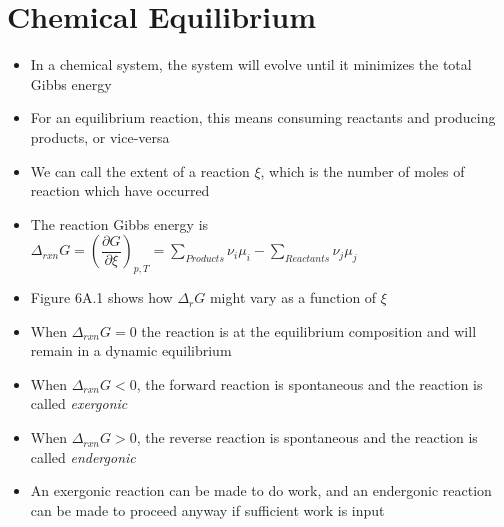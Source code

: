 \documentclass[12pt, openany, letterpaper]{memoir}
\begin{document}
\chapter{Chemical Equilibrium}
\begin{itemize}
	\item In a chemical system, the system will evolve until it minimizes the total Gibbs energy
	\item For an equilibrium reaction, this means consuming reactants and producing products, or vice-versa
	\item We can call the extent of a reaction $\xi$, which is the number of moles of reaction which have occurred
	\item The reaction Gibbs energy is $\Delta_{rxn}G=\left(\dfrac{\partial G}{\partial \xi}\right)_{p,T} = \displaystyle\sum\limits_{Products}\nu_i\mu_i - \displaystyle\sum\limits_{Reactants}\nu_j\mu_j$
	\item Figure 6A.1 shows how $\Delta_{r}G$ might vary as a function of $\xi$
	\item When $\Delta_{rxn}G=0$ the reaction is at the equilibrium composition and will remain in a dynamic equilibrium
	\item When $\Delta_{rxn}G<0$, the forward reaction is spontaneous and the reaction is called \emph{exergonic}
	\item When $\Delta_{rxn}G>0$, the reverse reaction is spontaneous and the reaction is called \emph{endergonic}
	\item An exergonic reaction can be made to do work, and an endergonic reaction can be made to proceed anyway if sufficient work is input
\end{itemize}
\end{document}
